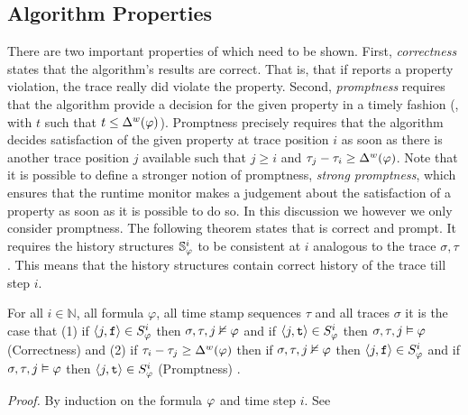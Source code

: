 \subsection{Algorithm Properties}
There are two important properties of \monitor which need to be shown. First, \emph{correctness} states that the algorithm's results are correct.
That is, that if \monitor reports a property violation, the trace really did violate the property. 
Second, \emph{promptness} requires that the algorithm provide a decision for the given property in a timely fashion (\ie, with $t$ such that $t\leq \Delta^w(\varphi)$).
Promptness precisely requires that the algorithm decides satisfaction of the given property at trace position $i$ as soon as there is another trace position $j$ available such that $j\geq i$ and $\tau_j-\tau_i \geq \Delta^w(\varphi)$.
Note that it is possible to define a stronger notion of promptness, \emph{strong promptness}, which ensures that the runtime monitor makes a judgement about the satisfaction of a property as soon as it is possible to do so. In this discussion we however we only consider promptness.
%
%
The following theorem states that \monitor is correct and prompt. It requires  the history structures $\mathbb{S}^{i}_{\varphi}$ to be consistent at $i$ analogous to the trace $\sigma,\tau$.
This means that the history structures contain correct history of the trace till step $i$. %

\begin{theorem}
For all $i \in \mathbb{N}$, all formula $\varphi$, all time stamp sequences $\tau$ and all traces $\sigma$ it is the case that (1) if $\langle j, \mathrm{\texttt{f}} \rangle \in {S}^{i}_{\varphi}$ then $\sigma, \tau, j \nvDash \varphi$ and if $\langle j, \mathrm{\texttt{t}} \rangle \in {S}^{i}_{\varphi}$ then $\sigma, \tau, j \vDash \varphi$ (Correctness) and (2) if $\tau_i - \tau_j \geq \Delta^w(\varphi)$ then if $\sigma, \tau, j \nvDash \varphi$ then $\langle j, \mathrm{\texttt{f}} \rangle \in {S}^{i}_{\varphi}$ and if $\sigma, \tau, j \vDash \varphi$ then $\langle j, \mathrm{\texttt{t}} \rangle \in {S}^{i}_{\varphi}$ (Promptness)
.
\end{theorem}
\textit{Proof.} By  induction on the  formula $\varphi$ and time step $i$. See \cite{Kane2015} \\

